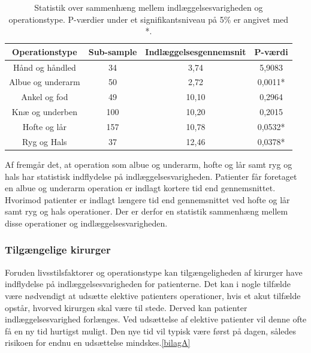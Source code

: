 \begin{table}[H]
\centering
\begin{tabular}{|c|c|c|c|}
\hline
\textbf{Operationstype} & \textbf{Sub-sample} & \textbf{Indlæggelsesgennemsnit} & \textbf{P-værdi} \\ \hline
Hånd og håndled   & 34                  & 3,74                            & 5,9083           \\ \hline
Albue og underarm & 50                  & 2,72                            & 0,0011*          \\ \hline
Ankel og fod      & 49                  & 10,10                           & 0,2964           \\ \hline
Knæ og underben   & 100                 & 10,20                           & 0,2015           \\ \hline
Hofte og lår      & 157                 & 10,78                           & 0,0532*          \\ \hline
Ryg og Hals       & 37                  & 12,46                           & 0,0378*          \\ \hline
\end{tabular}
\caption{Statistik over sammenhæng mellem indlæggelsesvarigheden og operationstype. P-værdier under et signifikantsniveau på 5\% er angivet med *.}
\label{optypeogindlaegtab}
\end{table}

\noindent
Af  fremgår det, at  operation som albue og underarm, hofte og lår samt ryg og hals har statistisk indflydelse på indlæggelsesvarigheden. Patienter får foretaget en  albue og underarm operation er indlagt kortere tid end gennemsnittet. Hvorimod patienter er indlagt længere tid end gennemsnittet ved hofte og lår samt ryg og hals operationer. Der er derfor en statistik sammenhæng mellem disse operationer og indlæggelsesvarigheden. 


\subsubsection{Tilgængelige kirurger}
Foruden livsstilsfaktorer og operationstype kan tilgængeligheden af kirurger have indflydelse på indlæggelsesvarigheden for patienterne. Det kan i nogle tilfælde være nødvendigt at udsætte elektive patienters operationer, hvis et akut tilfælde opstår, hvorved kirurgen skal være til stede. Derved kan patienter indlæggelsesvarighed forlænges. Ved udsættelse af elektive patienter vil denne ofte få en ny tid hurtigst muligt. Den nye tid vil typisk være først på dagen, således risikoen for endnu en udsættelse mindskes.\ref{bilagA}